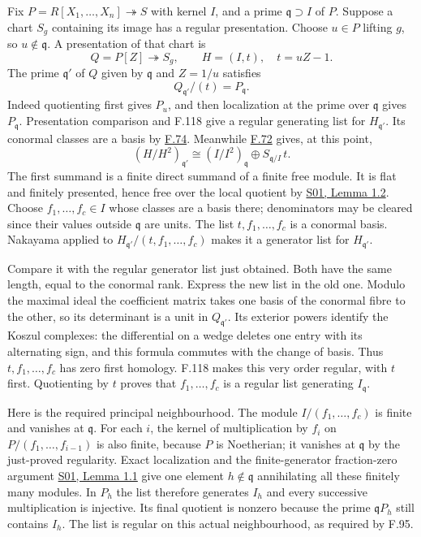 \documentclass[11pt,a4paper,openany]{report}
\begin{document}
Fix \(P=R[X_1,\ldots,X_n]\twoheadrightarrow S\) with kernel \(I\), and a prime \(\mathfrak q\supset I\) of \(P\). Suppose a chart \(S_g\) containing its image has a regular presentation. Choose \(u\in P\) lifting \(g\), so \(u\notin\mathfrak q\). A presentation of that chart is \[
Q=P[Z]\twoheadrightarrow S_g,\qquad H=(I,t),\quad t=uZ-1.
\] The prime \(\mathfrak q'\) of \(Q\) given by \(\mathfrak q\) and \(Z=1/u\) satisfies \[
Q_{\mathfrak q'}/(t)=P_{\mathfrak q}.
\] Indeed quotienting first gives \(P_u\), and then localization at the prime over \(\mathfrak q\) gives \(P_{\mathfrak q}\). Presentation comparison and F.118 give a regular generating list for \(H_{\mathfrak q'}\). Its conormal classes are a basis by \hyperref[AG-RG-S05-algebra-lemma-regular-quasi-regular]{F.74}. Meanwhile \hyperref[AG-RG-S05-algebra-lemma-principal-localization-NL]{F.72} gives, at this point, \[
(H/H^2)_{\mathfrak q'}
\cong (I/I^2)_{\mathfrak q}\oplus S_{\mathfrak q/I}\,t.
\] The first summand is a finite direct summand of a finite free module. It is flat and finitely presented, hence free over the local quotient by \href{https://github.com/KokunoYumeto/open-math-courses/blob/main/docs/courses/AG-RG/AG-RG-S01.md}{S01, Lemma 1.2}. Choose \(f_1,\ldots,f_c\in I\) whose classes are a basis there; denominators may be cleared since their values outside \(\mathfrak q\) are units. The list \(t,f_1,\ldots,f_c\) is a conormal basis. Nakayama applied to \(H_{\mathfrak q'}/(t,f_1,\ldots,f_c)\) makes it a generator list for \(H_{\mathfrak q'}\).

Compare it with the regular generator list just obtained. Both have the same length, equal to the conormal rank. Express the new list in the old one. Modulo the maximal ideal the coefficient matrix takes one basis of the conormal fibre to the other, so its determinant is a unit in \(Q_{\mathfrak q'}\). Its exterior powers identify the Koszul complexes: the differential on a wedge deletes one entry with its alternating sign, and this formula commutes with the change of basis. Thus \(t,f_1,\ldots,f_c\) has zero first homology. F.118 makes this very order regular, with \(t\) first. Quotienting by \(t\) proves that \(f_1,\ldots,f_c\) is a regular list generating \(I_{\mathfrak q}\).

Here is the required principal neighbourhood. The module \(I/(f_1,\ldots,f_c)\) is finite and vanishes at \(\mathfrak q\). For each \(i\), the kernel of multiplication by \(f_i\) on \(P/(f_1,\ldots,f_{i-1})\) is also finite, because \(P\) is Noetherian; it vanishes at \(\mathfrak q\) by the just-proved regularity. Exact localization and the finite-generator fraction-zero argument \href{https://github.com/KokunoYumeto/open-math-courses/blob/main/docs/courses/AG-RG/AG-RG-S01.md}{S01, Lemma 1.1} give one element \(h\notin\mathfrak q\) annihilating all these finitely many modules. In \(P_h\) the list therefore generates \(I_h\) and every successive multiplication is injective. Its final quotient is nonzero because the prime \(\mathfrak qP_h\) still contains \(I_h\). The list is regular on this actual neighbourhood, as required by F.95.
\end{document}
